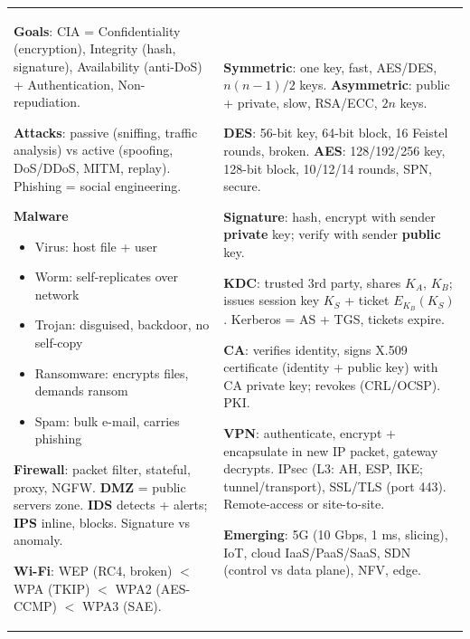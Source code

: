 \documentclass[10pt]{article}
\begin{document}
\newpage
\begin{cheatsheet}
\small
\begin{tabularx}{\linewidth}{@{}XX@{}}
\textbf{Goals}: CIA = Confidentiality (encryption), Integrity (hash, signature), Availability (anti-DoS) + Authentication, Non-repudiation.

\textbf{Attacks}: passive (sniffing, traffic analysis) vs active (spoofing, DoS/DDoS, MITM, replay). Phishing = social engineering.

\textbf{Malware}
\begin{itemize}
\item Virus: host file + user
\item Worm: self-replicates over network
\item Trojan: disguised, backdoor, no self-copy
\item Ransomware: encrypts files, demands ransom
\item Spam: bulk e-mail, carries phishing
\end{itemize}
\textbf{Firewall}: packet filter, stateful, proxy, NGFW. \textbf{DMZ} = public servers zone.
\textbf{IDS} detects + alerts; \textbf{IPS} inline, blocks. Signature vs anomaly.

\textbf{Wi-Fi}: WEP (RC4, broken) $<$ WPA (TKIP) $<$ WPA2 (AES-CCMP) $<$ WPA3 (SAE).
&
\textbf{Symmetric}: one key, fast, AES/DES, $n(n-1)/2$ keys.\newline
\textbf{Asymmetric}: public + private, slow, RSA/ECC, $2n$ keys.

\textbf{DES}: 56-bit key, 64-bit block, 16 Feistel rounds, broken.\newline
\textbf{AES}: 128/192/256 key, 128-bit block, 10/12/14 rounds, SPN, secure.

\textbf{Signature}: hash, encrypt with sender \textbf{private} key; verify with sender \textbf{public} key.

\textbf{KDC}: trusted 3rd party, shares $K_A$, $K_B$; issues session key $K_S$ + ticket $E_{K_B}(K_S)$. Kerberos = AS + TGS, tickets expire.

\textbf{CA}: verifies identity, signs X.509 certificate (identity + public key) with CA private key; revokes (CRL/OCSP). PKI.

\textbf{VPN}: authenticate, encrypt + encapsulate in new IP packet, gateway decrypts. IPsec (L3: AH, ESP, IKE; tunnel/transport), SSL/TLS (port 443). Remote-access or site-to-site.

\textbf{Emerging}: 5G (10 Gbps, 1 ms, slicing), IoT, cloud IaaS/PaaS/SaaS, SDN (control vs data plane), NFV, edge.
\end{tabularx}
\end{cheatsheet}
\end{document}
